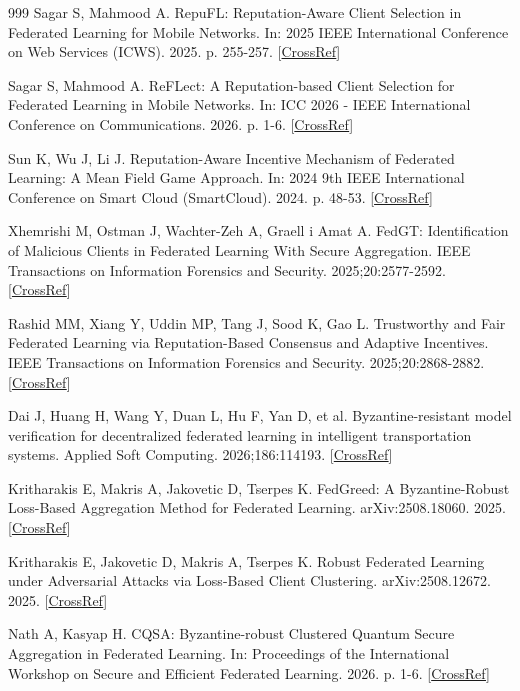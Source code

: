 \documentclass[cmc,article,submit,moreauthors,pdftex]{Definitions/tsp}
\begin{document}
\begin{thebibliography}{999}
Sagar S, Mahmood A. RepuFL: Reputation-Aware Client Selection in Federated Learning for Mobile Networks. In: 2025 IEEE International Conference on Web Services (ICWS). 2025. p. 255-257. [\href{https://doi.org/10.1109/icws67624.2025.00039}{CrossRef}]

Sagar S, Mahmood A. ReFLect: A Reputation-based Client Selection for Federated Learning in Mobile Networks. In: ICC 2026 - IEEE International Conference on Communications. 2026. p. 1-6. [\href{https://doi.org/10.1109/icc59461.2026.11586954}{CrossRef}]

Sun K, Wu J, Li J. Reputation-Aware Incentive Mechanism of Federated Learning: A Mean Field Game Approach. In: 2024 9th IEEE International Conference on Smart Cloud (SmartCloud). 2024. p. 48-53. [\href{https://doi.org/10.1109/smartcloud62736.2024.00016}{CrossRef}]

Xhemrishi M, Ostman J, Wachter-Zeh A, Graell i Amat A. FedGT: Identification of Malicious Clients in Federated Learning With Secure Aggregation. IEEE Transactions on Information Forensics and Security. 2025;20:2577-2592. [\href{https://doi.org/10.1109/TIFS.2025.3539964}{CrossRef}]

Rashid MM, Xiang Y, Uddin MP, Tang J, Sood K, Gao L. Trustworthy and Fair Federated Learning via Reputation-Based Consensus and Adaptive Incentives. IEEE Transactions on Information Forensics and Security. 2025;20:2868-2882. [\href{https://doi.org/10.1109/TIFS.2025.3546841}{CrossRef}]

Dai J, Huang H, Wang Y, Duan L, Hu F, Yan D, et al. Byzantine-resistant model verification for decentralized federated learning in intelligent transportation systems. Applied Soft Computing. 2026;186:114193. [\href{https://doi.org/10.1016/j.asoc.2025.114193}{CrossRef}]

Kritharakis E, Makris A, Jakovetic D, Tserpes K. FedGreed: A Byzantine-Robust Loss-Based Aggregation Method for Federated Learning. arXiv:2508.18060. 2025. [\href{https://doi.org/10.48550/arXiv.2508.18060}{CrossRef}]

Kritharakis E, Jakovetic D, Makris A, Tserpes K. Robust Federated Learning under Adversarial Attacks via Loss-Based Client Clustering. arXiv:2508.12672. 2025. [\href{https://doi.org/10.48550/arXiv.2508.12672}{CrossRef}]

Nath A, Kasyap H. CQSA: Byzantine-robust Clustered Quantum Secure Aggregation in Federated Learning. In: Proceedings of the International Workshop on Secure and Efficient Federated Learning. 2026. p. 1-6. [\href{https://doi.org/10.1145/3803630.3809169}{CrossRef}]


\end{thebibliography}
\end{document}
